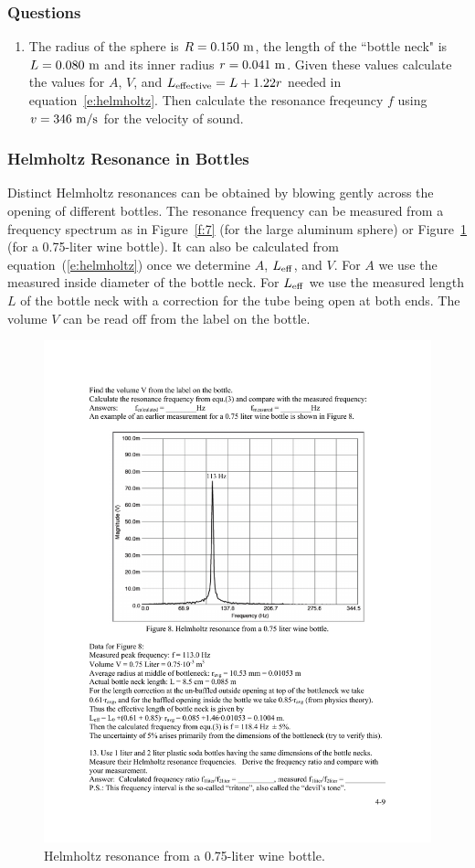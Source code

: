 \documentclass[11pt]{NSF}
\def\ben{\begin{enumerate}}
\def\een{\end{enumerate}}
\def\i{\item{}}
\begin{document}
\subsubsection*{Questions}
\ben
\i The radius of the sphere is $R=0.150~{\rm m}$, the length of the ``bottle neck" is 
$L=0.080~{\rm m}$ and its inner radius $r=0.041~{\rm m}$.
Given these values calculate the values for 
$A$, $V$, and $L_{\rm effective}=L+1.22 r$ needed in equation~\ref{e:helmholtz}.
Then calculate the resonance freqeuncy $f$ using $v=346~{\rm m/s}$ for the 
velocity of sound.

\een

\subsubsection{Helmholtz Resonance in Bottles}

Distinct Helmholtz resonances can be obtained by blowing 
gently across the opening of different bottles. 
The resonance frequency can be measured from a 
frequency spectrum as in Figure~\ref{f:7} (for the 
large aluminum sphere) or 
Figure~\ref{f:8} (for a 0.75-liter wine bottle).
It can also be calculated from equation~(\ref{e:helmholtz})
once we determine $A$, $L_{\rm eff}$, and $V$.
For $A$ we use the measured inside diameter of the
bottle neck.
For $L_{\rm eff}$ we use the measured length $L$ of the 
bottle neck with a correction for the tube being open at 
both ends.
The volume $V$ can be read off from the label on the bottle.
%
\begin{figure}[hbtp]
\begin{center}
\includegraphics[width=.7\textwidth]{fig4_8}
\caption{Helmholtz resonance from a 0.75-liter wine bottle.}
\label{f:8} 
\end{center} 
\end{figure}
%
\end{document}
